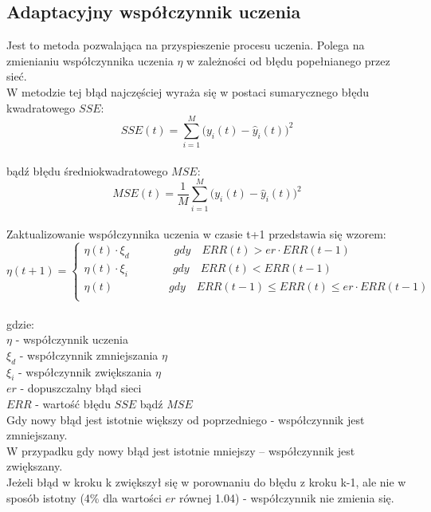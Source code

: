 \documentclass[a4paper, openright, twoside,11pt]{article}
\begin{document}
    \clearpage
    \subsection{Adaptacyjny współczynnik uczenia}
    Jest to metoda pozwalająca na przyspieszenie procesu uczenia. Polega na zmienianiu współczynnika uczenia $\eta$ w zależności od błędu popełnianego przez sieć.\\ 
    W metodzie tej błąd najczęściej wyraża się w postaci sumarycznego błędu kwadratowego $SSE$:
     \begin{equation}
        SSE(t)=\sum_{i=1}^M\bigg(y_i(t)-\hat{y}_i(t)\bigg)^2
    \end{equation}\\[0.1cm]
    bądź błędu średniokwadratowego $MSE$:
    \begin{equation}
         MSE(t)=\frac{1}{M}\sum_{i=1}^M\bigg(y_i(t)-\hat{y}_i(t)\bigg)^2
    \end{equation}\\[0.2cm]
    
    Zaktualizowanie współczynnika uczenia w czasie t+1 przedstawia się wzorem:
    \begin{equation}
        \eta(t+1)=\begin{cases}
            \eta(t) \cdot\xi _d \qquad \qquad gdy\quad ERR(t)>er\cdot ERR(t-1)\\
            \eta(t) \cdot\xi _i \qquad \qquad gdy\quad ERR(t)<ERR(t-1)\\
            \eta(t) \qquad \quad \qquad gdy\quad ERR(t-1) \leq ERR(t)\leq er\cdot ERR(t-1)\\
        \end{cases}
    \end{equation}\\[0.2cm]
     gdzie:\\[0.3cm]
     $\eta$ - współczynnik uczenia\\
     $\xi _d$ - współczynnik zmniejszania $\eta$\\
     $\xi _i$ - współczynnik zwiększania $\eta$\\
     $er$ - dopuszczalny błąd sieci\\
     $ERR$ - wartość błędu $SSE$ bądź $MSE$\\[0.5cm]
     
     
    Gdy nowy błąd jest istotnie większy od poprzedniego - współczynnik jest zmniejszany.\\
    W przypadku gdy nowy błąd jest istotnie mniejszy – współczynnik jest zwiększany.\\
    Jeżeli błąd w kroku k zwiększył się w porownaniu do błędu z kroku k-1, ale nie w sposób istotny (4\% dla wartości $er$ równej 1.04) - współczynnik nie zmienia się.
    
\end{document}
